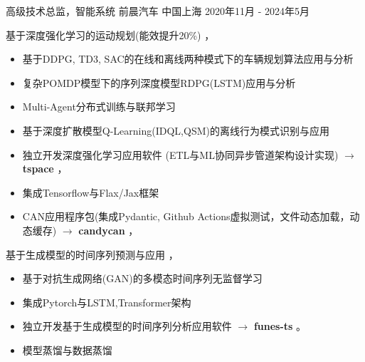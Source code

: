 \documentclass[../cv_cn.tex]{subfiles}
\begin{document}


\begin{cventries}

	\cventry
	{高级技术总监，智能系统} %
	{前晨汽车} %
	{中国上海} %
	{2020年11月 - 2024年5月} %
	{
		\begin{cvitems} %
			\item 基于深度强化学习的运动规划(能效提升20\%) \supercite{Xin_VEOS_22} \supercite{Xin_Fu_Pan_Simulation_Test_RL_22} \supercite{Pan_Xin_DrvStyle_23}，
			\begin{itemize}
				\item 基于DDPG, TD3, SAC的在线和离线两种模式下的车辆规划算法应用与分析
				\item 复杂POMDP模型下的序列深度模型RDPG(LSTM)应用与分析
				\item Multi-Agent分布式训练与联邦学习
				\item 基于深度扩散模型Q-Learning(IDQL,QSM)的离线行为模式识别与应用
				\item 独立开发深度强化学习应用软件 (ETL与ML协同异步管道架构设计实现) $\rightarrow$ \textbf{tspace} \href{https://binjian.github.io/tspace/}{\faGithub}，
				\item 集成Tensorflow与Flax/Jax框架
				\item CAN应用程序包(集成Pydantic, Github Actions虚拟测试，文件动态加载，动态缓存) $\rightarrow$ \textbf{candycan} \href{https://binjian.github.io/candycan/}{\faGithub}，
			\end{itemize}
			\item 基于生成模型的时间序列预测与应用 \supercite{Xin_GenAI_23} \supercite{Xin_Chen_NN_TSFeatures_23}，
			\begin{itemize}
				\item 基于对抗生成网络(GAN)的多模态时间序列无监督学习
				\item 集成Pytorch与LSTM,Transformer架构
				\item 独立开发基于生成模型的时间序列分析应用软件 $\rightarrow$ \textbf{funes-ts} \href{https://github.com/binjian/funes-ts/}{\faGithub}。
				\item 模型蒸馏与数据蒸馏

\end{itemize}
\end{cvitems}}
\end{cventries}
\end{document}
